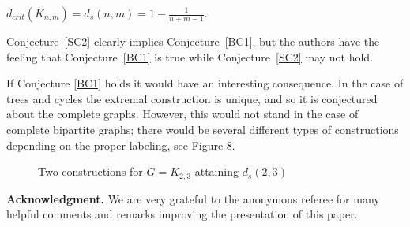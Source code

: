 \documentclass[12pt,a4paper]{amsart}
\numberwithin{equation}{section}
\begin{document}
\begin{conj} \label{BC1} $d_{crit}(K_{n,m})=d_s(n,m)=1-\frac{1}{n+m-1}.$
\end{conj}

\begin{remark}  Conjecture~\ref{SC2} clearly implies  Conjecture~\ref{BC1},
  but the authors have the feeling that Conjecture~\ref{BC1} is true while
  Conjecture~\ref{SC2} may not hold.
\end{remark}

If Conjecture \ref{BC1} holds it would have an interesting consequence.
In the case of trees and cycles the extremal construction is unique, and so it
is conjectured about the complete graphs. However, this would not stand in the
case of complete bipartite graphs; there would be several different types of
constructions depending on the proper labeling, see Figure 8.

\begin{figure}[h!]
\begin{center}
   \caption{Two constructions
  for $G=K_{2,3}$ attaining $d_s(2,3)$}  
\end{center}
\end{figure} 
\bigskip

\noindent \textbf{Acknowledgment.} We are very grateful to the anonymous
referee for many helpful comments and remarks improving the presentation
of this paper. 

  
\end{document}
